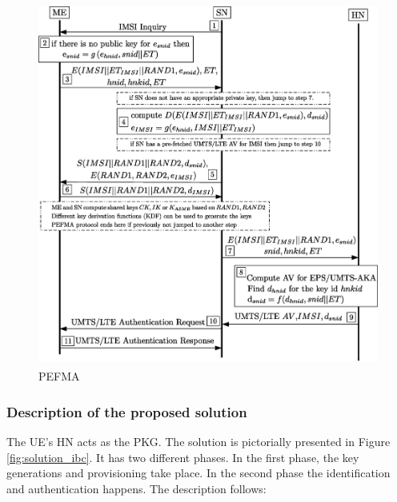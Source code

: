 \documentclass{river-journal}
\begin{document}
\begin{figure}
\begin{center}
  \includegraphics[height=12cm]{PEFMA.eps}
\caption{PEFMA}
\label{fig:PEFMA}       %
\end{center}
\end{figure}



\subsubsection{Description of the proposed solution}
The UE's HN acts as the PKG. The solution is pictorially presented in Figure \ref{fig:solution_ibc}. It has two different phases. In the first phase, the key generations and provisioning take place. In the second phase the identification and authentication happens. The description follows:
\end{document}
